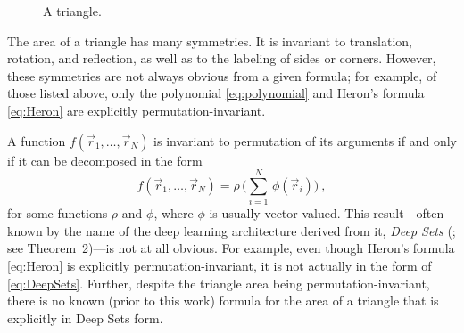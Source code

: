 \documentclass[10pt]{article}
\begin{document}
\begin{figure}[t!]
    \caption{A triangle.}
    \label{fig:triangle}
\end{figure}

The area of a triangle has many symmetries. It is invariant to translation, rotation, and reflection, as well as to the labeling of sides or corners. However, these symmetries are not always obvious from a given formula; for example, of those listed above, only the polynomial \eqref{eq:polynomial} and Heron's formula \eqref{eq:Heron} are explicitly permutation-invariant.

A function $f(\vec{r}_1, \dots, \vec{r}_N)$ is invariant to permutation of its arguments if and only if it can be decomposed in the form
\begin{equation}
    f(\vec{r}_1, \dots, \vec{r}_N) = \rho \, \big( \sum_{i=1}^{N} \, \phi(\vec{r}_i) \big)~,\label{eq:DeepSets}
\end{equation}
for some functions $\rho$ and $\phi$, where $\phi$ is usually vector valued.
This result---often known by the name of the deep learning architecture derived from it, \emph{Deep Sets} (\citealt{Zaheer+17deepsets}; see Theorem~2)---is not at all obvious.
For example, even though Heron's formula \eqref{eq:Heron} is explicitly permutation-invariant, it is not actually in the form of \eqref{eq:DeepSets}. 
Further, despite the triangle area being permutation-invariant, there is no known (prior to this work) formula for the area of a triangle that is explicitly in Deep Sets form.
\end{document}
